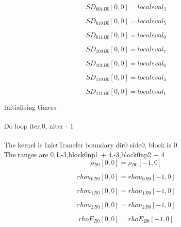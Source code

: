 \documentclass{article}
\begin{document}
\begin{dmath}{SD_{001}{_{B0}}}[{0,0}] = localeval_{3}\end{dmath}

\begin{dmath}{SD_{010}{_{B0}}}[{0,0}] = localeval_{5}\end{dmath}

\begin{dmath}{SD_{011}{_{B0}}}[{0,0}] = localeval_{0}\end{dmath}

\begin{dmath}{SD_{100}{_{B0}}}[{0,0}] = localeval_{7}\end{dmath}

\begin{dmath}{SD_{101}{_{B0}}}[{0,0}] = localeval_{6}\end{dmath}

\begin{dmath}{SD_{110}{_{B0}}}[{0,0}] = localeval_{4}\end{dmath}

\begin{dmath}{SD_{111}{_{B0}}}[{0,0}] = localeval_{1}\end{dmath}

\noindent Initialising timers\\
\\\noindent Do loop iter,0, niter - 1\\
\\\noindent The kernel is InletTransfer boundary dir0 side0, block is 0\\\noindent The ranges are 0,1,-3,block0np1 + 4,-3,block0np2 + 4\\\begin{dmath}{\rho{_{B0}}}[{0,0}] = {\rho{_{B0}}}[{-1,0}]\end{dmath}

\begin{dmath}{rhou_{0}{_{B0}}}[{0,0}] = {rhou_{0}{_{B0}}}[{-1,0}]\end{dmath}

\begin{dmath}{rhou_{1}{_{B0}}}[{0,0}] = {rhou_{1}{_{B0}}}[{-1,0}]\end{dmath}

\begin{dmath}{rhou_{2}{_{B0}}}[{0,0}] = {rhou_{2}{_{B0}}}[{-1,0}]\end{dmath}

\begin{dmath}{rhoE{_{B0}}}[{0,0}] = {rhoE{_{B0}}}[{-1,0}]\end{dmath}
\end{document}
